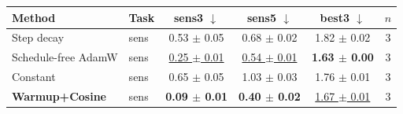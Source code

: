 \begin{tabular}{llcccc}
\toprule
Method & Task & sens3 $\downarrow$ & sens5 $\downarrow$ & best3 $\downarrow$ & $n$ \\
\midrule
\midrule
\midrule
\midrule
\midrule
\midrule
Step decay & sens & 0.53 $\pm$ 0.05 & 0.68 $\pm$ 0.02 & 1.82 $\pm$ 0.02 & 3 \\
Schedule-free AdamW & sens & \underline{0.25 $\pm$ 0.01} & \underline{0.54 $\pm$ 0.01} & \textbf{1.63 $\pm$ 0.00} & 3 \\
Constant & sens & 0.65 $\pm$ 0.05 & 1.03 $\pm$ 0.03 & 1.76 $\pm$ 0.01 & 3 \\
\textbf{Warmup+Cosine} & sens & \textbf{0.09 $\pm$ 0.01} & \textbf{0.40 $\pm$ 0.02} & \underline{1.67 $\pm$ 0.01} & 3 \\
\bottomrule
\end{tabular}
